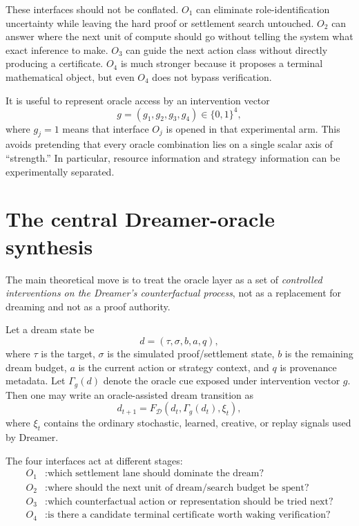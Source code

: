 \documentclass[11pt]{article}
\newcommand{\Dream}{\mathcal D}
\begin{document}
These interfaces should not be conflated. $O_1$ can eliminate role-identification uncertainty while leaving the hard proof or settlement search untouched. $O_2$ can answer where the next unit of compute should go without telling the system what exact inference to make. $O_3$ can guide the next action class without directly producing a certificate. $O_4$ is much stronger because it proposes a terminal mathematical object, but even $O_4$ does not bypass verification.

It is useful to represent oracle access by an intervention vector
\begin{equation}
g=(g_1,g_2,g_3,g_4)\in\{0,1\}^4,
\end{equation}
where $g_j=1$ means that interface $O_j$ is opened in that experimental arm. This avoids pretending that every oracle combination lies on a single scalar axis of ``strength.'' In particular, resource information and strategy information can be experimentally separated.

\section{The central Dreamer-oracle synthesis}

The main theoretical move is to treat the oracle layer as a set of \emph{controlled interventions on the Dreamer's counterfactual process}, not as a replacement for dreaming and not as a proof authority.

Let a dream state be
\begin{equation}
d=(\tau,\sigma,b,a,q),
\end{equation}
where $\tau$ is the target, $\sigma$ is the simulated proof/settlement state, $b$ is the remaining dream budget, $a$ is the current action or strategy context, and $q$ is provenance metadata. Let $\Gamma_g(d)$ denote the oracle cue exposed under intervention vector $g$. Then one may write an oracle-assisted dream transition as
\begin{equation}
d_{t+1}
=
F_{\Dream}(d_t,\Gamma_g(d_t),\xi_t),
\end{equation}
where $\xi_t$ contains the ordinary stochastic, learned, creative, or replay signals used by Dreamer.

The four interfaces act at different stages:
\begin{align}
O_1 &: \text{which settlement lane should dominate the dream?}\\
O_2 &: \text{where should the next unit of dream/search budget be spent?}\\
O_3 &: \text{which counterfactual action or representation should be tried next?}\\
O_4 &: \text{is there a candidate terminal certificate worth waking verification?}
\end{align}
\end{document}
